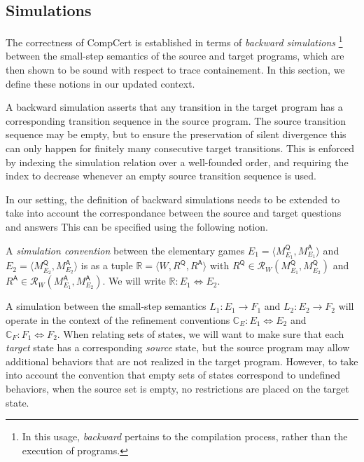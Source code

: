 \documentclass[sigplan,10pt,review,anonymous]{acmart}
\newcommand{\kw}[1]{\ensuremath{ \mathsf{#1} }}
\begin{document}
\subsection{Simulations} \label{sec:modsem:sim} %
\label{sec:modsem:ref}

The correctness of CompCert is established in terms of
\emph{backward simulations}%
\footnote{In this usage, \emph{backward} pertains to
  the compilation process,
  rather than the execution of programs.}
between the small-step semantics of the source and target programs,
which are then shown to be sound with respect to trace containement.
In this section,
we define these notions in our updated context.

A backward simulation asserts that any transition in the target program
has a corresponding transition sequence in the source program.
The source transition sequence may be empty,
but to ensure the preservation of silent divergence
this can only happen for finitely many consecutive target transitions.
This is enforced by indexing the simulation relation
over a well-founded order,
and requiring the index to decrease
whenever an empty source transition sequence is used.

In our setting,
the definition of backward simulations needs to be extended
to take into account the correspondance between
the source and target questions and answers
This can be specified using the following notion.

\begin{definition} %
A \emph{simulation convention} between the elementary games
$E_1 = \langle M_{E_1}^\kw{Q}, M_{E_1}^\kw{A} \rangle$ and
$E_2 = \langle M_{E_2}^\kw{Q}, M_{E_2}^\kw{A} \rangle$
is as a tuple $\mathbb{R} = \langle W, R^\kw{Q}, R^\kw{A} \rangle$
with $R^\kw{Q} \in \mathcal{R}_W(M_{E_1}^\kw{Q}, M_{E_2}^\kw{Q})$
and $R^\kw{A} \in \mathcal{R}_W(M_{E_1}^\kw{A}, M_{E_2}^\kw{A})$.
We will write $\mathbb{R} : E_1 \Leftrightarrow E_2$.
\end{definition}

A simulation between the small-step semantics
$L_1 : E_1 \rightarrow F_1$ and
$L_2 : E_2 \rightarrow F_2$ will
operate in the context of the refinement conventions
$\mathbb{C}_E : E_1 \Leftrightarrow E_2$ and
$\mathbb{C}_F : F_1 \Leftrightarrow F_2$.
When relating sets of states,
we will want to make sure that
each \emph{target} state has a corresponding \emph{source} state,
but the source program may allow additional behaviors
that are not realized in the target program.
However, to take into account the convention that
empty sets of states correspond to undefined behaviors,
when the source set is empty,
no restrictions are placed on the target state.
\end{document}
